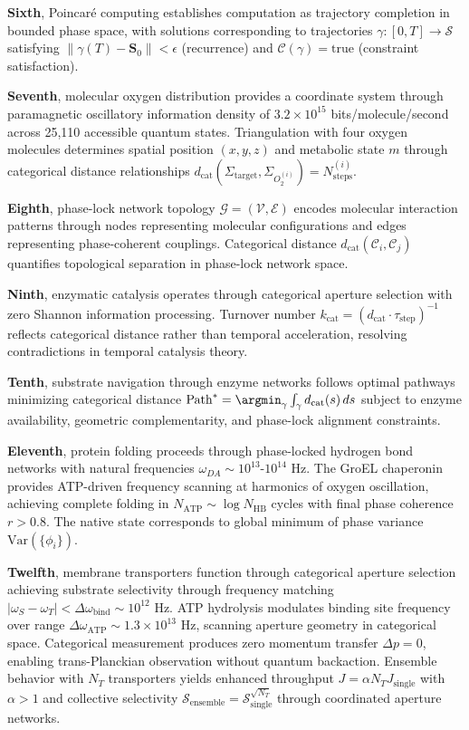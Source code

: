 \documentclass[12pt,a4paper]{article}
\theoremstyle{plain}
\theoremstyle{definition}
\theoremstyle{remark}
\newcommand{\Sspace}{\mathcal{S}}
\newcommand{\Scoord}{\mathbf{S}}
\newcommand{\dcat}{d_{\mathrm{cat}}}
\begin{document}
\textbf{Sixth}, Poincaré computing establishes computation as trajectory completion in bounded phase space, with solutions corresponding to trajectories $\gamma: [0,T] \to \Sspace$ satisfying $\|\gamma(T) - \Scoord_0\| < \epsilon$ (recurrence) and $\mathcal{C}(\gamma) = \text{true}$ (constraint satisfaction).

\textbf{Seventh}, molecular oxygen distribution provides a coordinate system through paramagnetic oscillatory information density of $3.2 \times 10^{15}$ bits/molecule/second across 25,110 accessible quantum states. Triangulation with four oxygen molecules determines spatial position $(x,y,z)$ and metabolic state $m$ through categorical distance relationships $\dcat(\Sigma_{\text{target}}, \Sigma_{O_2^{(i)}}) = N_{\text{steps}}^{(i)}$.

\textbf{Eighth}, phase-lock network topology $\mathcal{G} = (\mathcal{V}, \mathcal{E})$ encodes molecular interaction patterns through nodes representing molecular configurations and edges representing phase-coherent couplings. Categorical distance $\dcat(\mathcal{C}_i,\mathcal{C}_j)$ quantifies topological separation in phase-lock network space.

\textbf{Ninth}, enzymatic catalysis operates through categorical aperture selection with zero Shannon information processing. Turnover number $k_{\text{cat}} = (\dcat \cdot \tau_{\text{step}})^{-1}$ reflects categorical distance rather than temporal acceleration, resolving contradictions in temporal catalysis theory.

\textbf{Tenth}, substrate navigation through enzyme networks follows optimal pathways minimizing categorical distance $\text{Path}^* = \argmin_\gamma \int_\gamma \dcat(s) \, ds$ subject to enzyme availability, geometric complementarity, and phase-lock alignment constraints.

\textbf{Eleventh}, protein folding proceeds through phase-locked hydrogen bond networks with natural frequencies $\omega_{DA} \sim 10^{13}$-$10^{14}$ Hz. The GroEL chaperonin provides ATP-driven frequency scanning at harmonics of oxygen oscillation, achieving complete folding in $N_{\text{ATP}} \sim \log N_{\text{HB}}$ cycles with final phase coherence $r > 0.8$. The native state corresponds to global minimum of phase variance $\text{Var}(\{\phi_i\})$.

\textbf{Twelfth}, membrane transporters function through categorical aperture selection achieving substrate selectivity through frequency matching $|\omega_S - \omega_T| < \Delta \omega_{\text{bind}} \sim 10^{12}$ Hz. ATP hydrolysis modulates binding site frequency over range $\Delta \omega_{\text{ATP}} \sim 1.3 \times 10^{13}$ Hz, scanning aperture geometry in categorical space. Categorical measurement produces zero momentum transfer $\Delta p = 0$, enabling trans-Planckian observation without quantum backaction. Ensemble behavior with $N_T$ transporters yields enhanced throughput $J = \alpha N_T J_{\text{single}}$ with $\alpha > 1$ and collective selectivity $\mathcal{S}_{\text{ensemble}} = \mathcal{S}_{\text{single}}^{\sqrt{N_T}}$ through coordinated aperture networks.
\end{document}
